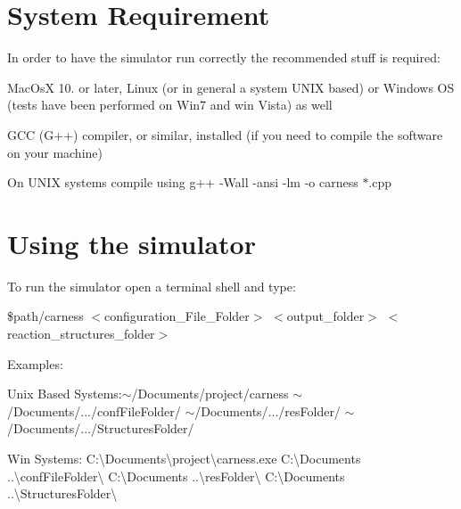 \begin{DoxyItemize}
\end{DoxyItemize}\hypertarget{a00002_sysreq}{}\section{System Requirement}\label{a00002_sysreq}


 In order to have the simulator run correctly the recommended stuff is required\-:
\begin{DoxyItemize}
\item Mac\-Os\-X 10. or later, Linux (or in general a system U\-N\-I\-X based) or Windows O\-S (tests have been performed on Win7 and win Vista) as well
\item G\-C\-C (G++) compiler, or similar, installed (if you need to compile the software on your machine)
\end{DoxyItemize}

On U\-N\-I\-X systems compile using {\ttfamily g++} -\/\-Wall -\/ansi -\/lm -\/o carness $\ast$.cpp \par
\par
 \hypertarget{a00002_secUsage}{}\section{Using the simulator}\label{a00002_secUsage}
To run the simulator open a terminal shell and type\-:\par
\par
 {\ttfamily } \$path/carness {\ttfamily } $<$configuration\-\_\-\-File\-\_\-\-Folder$>$ {\ttfamily } $<$output\-\_\-folder$>$ {\ttfamily } $<$reaction\-\_\-structures\-\_\-folder$>$\par
 Examples\-:
\begin{DoxyItemize}
\item Unix Based Systems\-:{\ttfamily $\sim$/\-Documents/project/carness} {\ttfamily $\sim$/\-Documents/}.../conf\-File\-Folder/ {\ttfamily $\sim$/\-Documents/}.../res\-Folder/ {\ttfamily $\sim$/\-Documents/}.../\-Structures\-Folder/
\item Win Systems\-: {\ttfamily C\-:\textbackslash{}Documents\textbackslash{}project\textbackslash{}carness.\-exe} {\ttfamily C\-:\textbackslash{}Documents} ..\textbackslash{}conf\-File\-Folder\textbackslash{} {\ttfamily C\-:\textbackslash{}Documents} ..\textbackslash{}res\-Folder\textbackslash{} {\ttfamily C\-:\textbackslash{}Documents} ..\textbackslash{}Structures\-Folder\textbackslash{}
\end{DoxyItemize}

